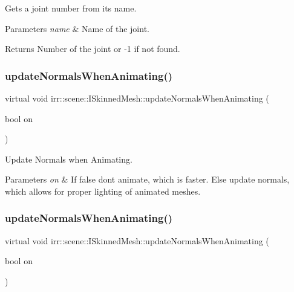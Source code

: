 Gets a joint number from its name. 


\begin{DoxyParams}{Parameters}
{\em name} & Name of the joint. \\
\hline
\end{DoxyParams}
\begin{DoxyReturn}{Returns}
Number of the joint or -\/1 if not found. 
\end{DoxyReturn}
\mbox{\label{classirr_1_1scene_1_1ISkinnedMesh_a19f264883a006d68b44f8b81d8ff5927}} 
\subsubsection{\texorpdfstring{update\+Normals\+When\+Animating()}{updateNormalsWhenAnimating()}\hspace{0.1cm}{\footnotesize\ttfamily [1/2]}}
{\footnotesize\ttfamily virtual void irr\+::scene\+::\+I\+Skinned\+Mesh\+::update\+Normals\+When\+Animating (\begin{DoxyParamCaption}\item[{bool}]{on }\end{DoxyParamCaption})\hspace{0.3cm}{\ttfamily [pure virtual]}}



Update Normals when Animating. 


\begin{DoxyParams}{Parameters}
{\em on} & If false don\textquotesingle{}t animate, which is faster. Else update normals, which allows for proper lighting of animated meshes. \\
\hline
\end{DoxyParams}
\mbox{\label{classirr_1_1scene_1_1ISkinnedMesh_a19f264883a006d68b44f8b81d8ff5927}} 
\subsubsection{\texorpdfstring{update\+Normals\+When\+Animating()}{updateNormalsWhenAnimating()}\hspace{0.1cm}{\footnotesize\ttfamily [2/2]}}
{\footnotesize\ttfamily virtual void irr\+::scene\+::\+I\+Skinned\+Mesh\+::update\+Normals\+When\+Animating (\begin{DoxyParamCaption}\item[{bool}]{on }\end{DoxyParamCaption})\hspace{0.3cm}{\ttfamily [pure virtual]}}



